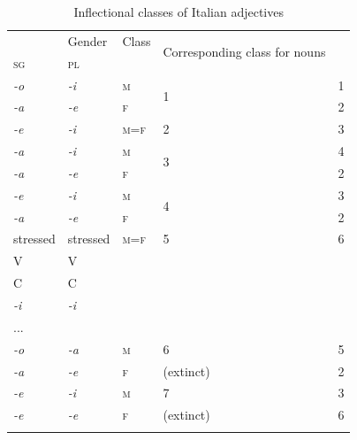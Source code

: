 \documentclass[output=paper,colorlinks,citecolor=brown]{langscibook}
\begin{document}
\begin{table}[ht]
	\centering
	\begin{tabularx}{0.85\textwidth}{p{1.5cm}p{1.5cm}p{1.5cm}p{1.5cm}X}
		\lsptoprule
			\multicolumn{2}{l}{Adjectives’ endings} & Gender\is{gender} & Class & \multirow{2}{2.5cm}{Corresponding class for nouns} \\
			\textsc{sg} & \textsc{pl} & & & \\
			\midrule
			\emph{-o} & \emph{-i} & \textsc{m} & \multirow{2}{*}{1} & 1 \\
			\emph{-a} & \emph{-e} & \textsc{f} & & 2 \\
			\hline
			\rowcolor{gray!25}
			\emph{-e} & \emph{-i} & \textsc{m=f} & 2 & 3 \\
			\hline
			\emph{-a} & \emph{-i} & \textsc{m} & \multirow{2}{*}{3} & 4 \\
			\emph{-a} & \emph{-e} & \textsc{f} & & 2 \\
			\hline
			\emph{-e} & \emph{-i} & \textsc{m} & \multirow{2}{*}{4} & 3 \\
			\emph{-a} & \emph{-e} & \textsc{f} & & 2 \\
			\hline
			\rowcolor{gray!25}
			stressed & stressed & \textsc{m=f} & 5 & 6 \\
			\rowcolor{gray!25}
			V & V & & & \\
			\rowcolor{gray!25}
			C & C & & & \\
			\rowcolor{gray!25}
			\emph{-i} & \emph{-i} & & & \\
			\rowcolor{gray!25}
			... & & & & \\
			\hline
			\emph{-o} & \emph{-a} & \textsc{m} & 6 & 5 \\
			\emph{-a} & \emph{-e} & \textsc{f} & (extinct) & 2 \\
			\hline
			\emph{-e} & \emph{-i} & \textsc{m} & 7 & 3 \\
			\emph{-e} & \emph{-e} & \textsc{f} & (extinct) & 6 \\
		\lspbottomrule
	\end{tabularx}
	\caption{Inflectional classes of Italian adjectives}
	\label{10tab4}
\end{table}\largerpage[0.5]
\end{document}

